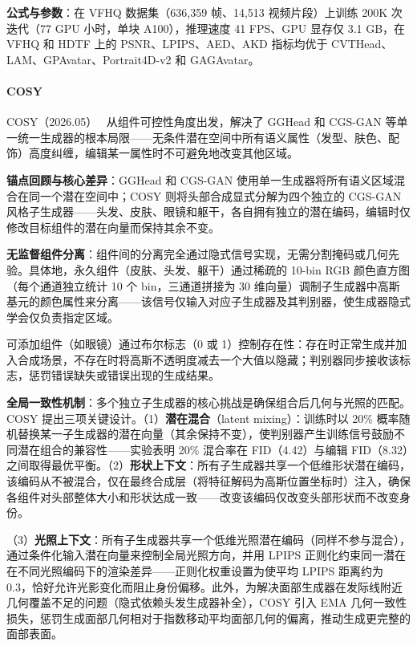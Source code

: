 \textbf{公式与参数}：在 VFHQ 数据集（636,359 帧、14,513 视频片段）上训练 200K 次迭代（77 GPU 小时，单块 A100），推理速度 41 FPS、GPU 显存仅 3.1 GB，在 VFHQ 和 HDTF 上的 PSNR、LPIPS、AED、AKD 指标均优于 CVTHead、LAM、GPAvatar、Portrait4D-v2 和 GAGAvatar。

\paragraph{COSY}

COSY（2026.05）~\cite{2605_24114} 从组件可控性角度出发，解决了 GGHead 和 CGS-GAN 等单一统一生成器的根本局限——无条件潜在空间中所有语义属性（发型、肤色、配饰）高度纠缠，编辑某一属性时不可避免地改变其他区域。

\textbf{锚点回顾与核心差异}：GGHead 和 CGS-GAN 使用单一生成器将所有语义区域混合在同一个潜在空间中；COSY 则将头部合成显式分解为四个独立的 CGS-GAN 风格子生成器——头发、皮肤、眼镜和躯干，各自拥有独立的潜在编码，编辑时仅修改目标组件的潜在向量而保持其余不变。

\textbf{无监督组件分离}：组件间的分离完全通过隐式信号实现，无需分割掩码或几何先验。具体地，永久组件（皮肤、头发、躯干）通过稀疏的 10-bin RGB 颜色直方图（每个通道独立统计 10 个 bin，三通道拼接为 30 维向量）调制子生成器中高斯基元的颜色属性来分离——该信号仅输入对应子生成器及其判别器，使生成器隐式学会仅负责指定区域。

可添加组件（如眼镜）通过布尔标志（0 或 1）控制存在性：存在时正常生成并加入合成场景，不存在时将高斯不透明度减去一个大值以隐藏；判别器同步接收该标志，惩罚错误缺失或错误出现的生成结果。

\textbf{全局一致性机制}：多个独立子生成器的核心挑战是确保组合后几何与光照的匹配。COSY 提出三项关键设计。（1）\textbf{潜在混合}（latent mixing）：训练时以 20\% 概率随机替换某一子生成器的潜在向量（其余保持不变），使判别器产生训练信号鼓励不同潜在组合的兼容性——实验表明 20\% 混合率在 FID（4.42）与编辑 FID（8.32）之间取得最优平衡。（2）\textbf{形状上下文}：所有子生成器共享一个低维形状潜在编码，该编码从不被混合，仅在最终合成层（将特征解码为高斯位置坐标时）注入，确保各组件对头部整体大小和形状达成一致——改变该编码仅改变头部形状而不改变身份。

（3）\textbf{光照上下文}：所有子生成器共享一个低维光照潜在编码（同样不参与混合），通过条件化输入潜在向量来控制全局光照方向，并用 LPIPS 正则化约束同一潜在在不同光照编码下的渲染差异——正则化权重设置为使平均 LPIPS 距离约为 0.3，恰好允许光影变化而阻止身份偏移。此外，为解决面部生成器在发际线附近几何覆盖不足的问题（隐式依赖头发生成器补全），COSY 引入 EMA 几何一致性损失，惩罚生成面部几何相对于指数移动平均面部几何的偏离，推动生成更完整的面部表面。

